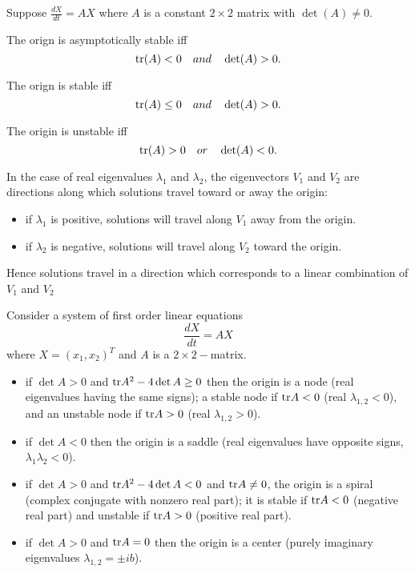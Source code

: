 \begin{theorem}
Suppose $\frac{dX}{dt}=A X$ where $A$ is a constant $2\times 2$ matrix with $\det (A) \not =0$. 

The orign is asymptotically stable iff
$$\textrm{tr}(A)<0 \quad and \quad \det (A)>0.$$

The orign is stable iff
$$\textrm{tr}(A)\leq 0 \quad and \quad \det (A)>0.$$


The origin is unstable iff 
$$\textrm{tr}(A)> 0 \quad or \quad \det (A)<0.$$
\end{theorem}


In the case of real eigenvalues $\lambda _1$ and $\lambda _2$, the eigenvectors $V_1$ and $V_2$ are directions along which solutions travel toward or away the origin:
\begin{itemize}
\item if $\lambda _1$ is positive, solutions will travel along $V_1$ away from the origin.
\item if $\lambda _2$ is negative, solutions will travel along $V_2$ toward the origin.
\end{itemize}
Hence solutions travel in a direction which corresponds to a linear combination of $V_1$ and $V_2$
\begin{theorem}
Consider a system of first order linear equations
$$\frac{dX}{dt}=A X$$
where $X=(x_1,x_2)^T$ and $A$ is a $2\times 2-$matrix.
\begin{itemize}
\item if $\det A >0$ and $\textrm{tr} A ^2 -4 \det A\geq 0$ then the origin is a node (real eigenvalues having the same signs); a stable node if $\textrm{tr} A <0$ (real $\lambda _{1,2}<0$), and an unstable node if $\textrm{tr} A >0$ (real $\lambda _{1,2}>0$).
\item if $\det A <0$ then the origin is a saddle (real eigenvalues have opposite signs, $\lambda _1 \lambda _2<0$).
\item if $\det A >0$ and $\textrm{tr} A ^2 -4 \det A < 0$ and $\textrm{tr} A \not =0$, the origin is a spiral (complex conjugate with nonzero real part); it is stable if $\textrm{tr} A <0$ (negative real part) and unstable if $\textrm{tr} A >0$ (positive real part).
\item if $\det A >0$ and $\textrm{tr} A=0$ then the origin is a center (purely imaginary eigenvalues $\lambda _{1,2}=\pm ib$).
\end{itemize}
\end{theorem}



